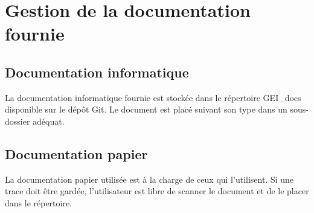 \section{Gestion de la documentation fournie}
\subsection{Documentation informatique}
La documentation informatique fournie est stockée dans le répertoire GEI\_docs
disponible sur le dépôt Git.
Le document est placé suivant son type dans un sous-dossier adéquat.
\subsection{Documentation papier}
La documentation papier utilisée est à la charge de ceux qui l'utilisent. Si 
une trace doit être gardée, l'utilisateur est libre de scanner le document et
de le placer dans le répertoire.
